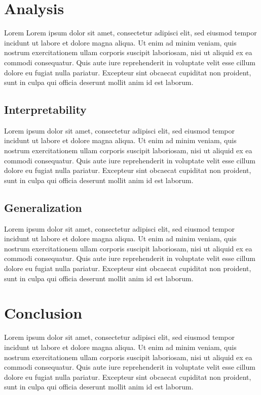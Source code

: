 \documentclass[11pt]{article} %
\begin{document}
\begin{multicols}{2}
  \section{Analysis}\label{analysis}

  Lorem Lorem ipsum dolor sit amet, consectetur adipisci elit, sed
  eiusmod tempor incidunt ut labore et dolore magna aliqua. Ut enim ad
  minim veniam, quis nostrum exercitationem ullam corporis suscipit
  laboriosam, nisi ut aliquid ex ea commodi consequatur. Quis aute iure
  reprehenderit in voluptate velit esse cillum dolore eu fugiat nulla
  pariatur. Excepteur sint obcaecat cupiditat non proident, sunt in
  culpa qui officia deserunt mollit anim id est laborum.


  \subsection{Interpretability}\label{interpretability}

  Lorem ipsum dolor sit amet, consectetur adipisci elit, sed eiusmod
  tempor incidunt ut labore et dolore magna aliqua. Ut enim ad minim
  veniam, quis nostrum exercitationem ullam corporis suscipit
  laboriosam, nisi ut aliquid ex ea commodi consequatur. Quis aute iure
  reprehenderit in voluptate velit esse cillum dolore eu fugiat nulla
  pariatur. Excepteur sint obcaecat cupiditat non proident, sunt in
  culpa qui officia deserunt mollit anim id est laborum.

  \subsection{Generalization}\label{generalization}

  Lorem ipsum dolor sit amet, consectetur adipisci elit, sed eiusmod
  tempor incidunt ut labore et dolore magna aliqua. Ut enim ad minim
  veniam, quis nostrum exercitationem ullam corporis suscipit
  laboriosam, nisi ut aliquid ex ea commodi consequatur. Quis aute iure
  reprehenderit in voluptate velit esse cillum dolore eu fugiat nulla
  pariatur. Excepteur sint obcaecat cupiditat non proident, sunt in
  culpa qui officia deserunt mollit anim id est laborum.

  \section{Conclusion}\label{conclusion}

  Lorem ipsum dolor sit amet, consectetur adipisci elit, sed eiusmod
  tempor incidunt ut labore et dolore magna aliqua. Ut enim ad minim
  veniam, quis nostrum exercitationem ullam corporis suscipit
  laboriosam, nisi ut aliquid ex ea commodi consequatur. Quis aute iure
  reprehenderit in voluptate velit esse cillum dolore eu fugiat nulla
  pariatur. Excepteur sint obcaecat cupiditat non proident, sunt in
  culpa qui officia deserunt mollit anim id est laborum.
\end{multicols}
\printbibliography %
\end{document}

